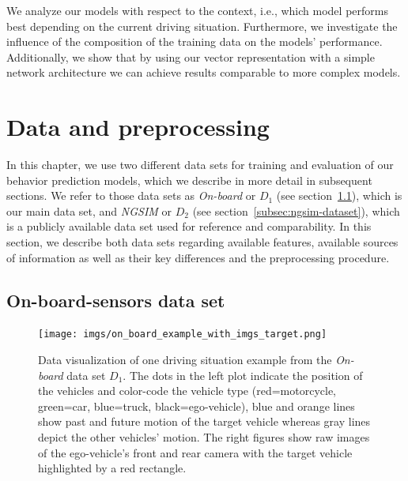 We analyze our models with respect to the context, i.e., which model performs best depending on the current driving situation.
Furthermore, we investigate the influence of the composition of the training data on the models' performance.
Additionally, we show that by using our vector representation with a simple network architecture we can achieve results comparable to more complex models.

\section{Data and preprocessing}
\label{sec:data_preproc}

In this chapter, we use two different data sets for training and evaluation of our behavior prediction models, which we describe in more detail in subsequent sections.
We refer to those data sets as \emph{On-board} or $D_1$ (see section~\ref{subsec:onboard-dataset}), which is our main data set, and \emph{\acs{NGSIM}} or $D_2$ (see section~\ref{subsec:ngsim-dataset}), which is a publicly available data set used for reference and comparability.
In this section, we describe both data sets regarding available features, available sources of information as well as their key differences and the preprocessing procedure.

\subsection{On-board-sensors data set}
\label{subsec:onboard-dataset}

\begin{figure}[t!]
	\centering
	\texttt{[image: imgs/on\_board\_example\_with\_imgs\_target.png]}
    \caption{Data visualization of one driving situation example from the \emph{On-board} data set $D_1$.
        The dots in the left plot indicate the position of the vehicles and color-code the vehicle type (red=motorcycle, green=car, blue=truck, black=ego-vehicle), blue and orange lines show past and future motion of the target vehicle whereas gray lines depict the other vehicles' motion.
        The right figures show raw images of the ego-vehicle's front and rear camera with the target vehicle
    highlighted by a red rectangle.}\label{fig:on_board_data_example}
\end{figure}

